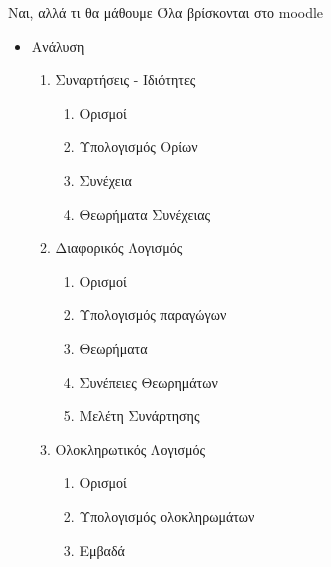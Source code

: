 \documentclass[greek]{beamer}
\begin{document}
\begin{frame}{Ναι, αλλά τι θα μάθουμε}
      Όλα βρίσκονται στο moodle
      \begin{itemize}
            \item<1->Ανάλυση \pause
            \begin{enumerate}
                  \item Συναρτήσεις - Ιδιότητες
                        \begin{enumerate}
                              \item Ορισμοί
                              \item Υπολογισμός Ορίων
                              \item Συνέχεια
                              \item Θεωρήματα Συνέχειας
                        \end{enumerate}
                  \item Διαφορικός Λογισμός
                        \begin{enumerate}
                              \item Ορισμοί
                              \item Υπολογισμός παραγώγων
                              \item Θεωρήματα
                              \item Συνέπειες Θεωρημάτων
                              \item Μελέτη Συνάρτησης
                        \end{enumerate}
                  \item Ολοκληρωτικός Λογισμός
                        \begin{enumerate}
                              \item Ορισμοί
                              \item Υπολογισμός ολοκληρωμάτων
                              \item Εμβαδά
                        \end{enumerate}
            \end{enumerate}
      \end{itemize}
\end{frame}
\end{document}
